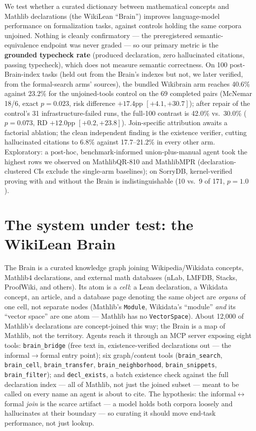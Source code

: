 \documentclass[10pt]{article}
\newcommand{\code}[1]{\texttt{#1}}
\begin{document}
We test whether a curated dictionary between mathematical concepts and
Mathlib declarations (the WikiLean ``Brain'') improves language-model
performance on formalization tasks, against controls holding the same
corpora unjoined. Nothing is cleanly confirmatory --- the preregistered
semantic-equivalence endpoint was never graded --- so our primary metric
is the \textbf{grounded typecheck rate} (produced declaration, zero
hallucinated citations, passing typecheck), which does not measure
semantic correctness. On 100 post-Brain-index tasks (held out from the
Brain's indexes but not, we later verified, from the formal-search arms'
sources), the bundled Wikibrain arm reaches 40.6\% against 23.2\% for the
unjoined-tools control on the 69 completed pairs (McNemar 18/6, exact
$p=0.023$, risk difference $+17.4$pp $[+4.1, +30.7]$); after repair of the
control's 31 infrastructure-failed runs, the full-100 contrast is 42.0\%
vs.\ 30.0\% ($p=0.073$, RD $+12.0$pp $[+0.2, +23.8]$). Join-specific
attribution awaits a factorial ablation; the clean independent finding is
the existence verifier, cutting hallucinated citations to 6.8\% against
17.7--21.2\% in every other arm. Exploratory: a post-hoc,
benchmark-informed union-plus-manual agent took the highest rows we
observed on MathlibQR-810 and MathlibMPR (declaration-clustered CIs
exclude the single-arm baselines); on SorryDB, kernel-verified proving
with and without the Brain is indistinguishable (10 vs.\ 9 of 171,
$p=1.0$).

\section{The system under test: the WikiLean Brain}\label{sec:system}

The Brain is a curated knowledge graph joining Wikipedia/Wikidata
concepts, Mathlib4 declarations, and external math databases (nLab, LMFDB,
Stacks, ProofWiki, and others). Its atom is a \emph{cell}: a Lean
declaration, a Wikidata concept, an article, and a database page denoting
the same object are \emph{organs} of one cell, not separate nodes
(Mathlib's \code{Module}, Wikidata's ``module'' \emph{and} its ``vector
space'' are one atom --- Mathlib has no \code{VectorSpace}). About
12{,}000 of Mathlib's declarations are concept-joined this way; the Brain
is a map of Mathlib, not the territory. Agents reach it through an MCP
server exposing eight tools: \code{brain\_bridge} (free text in,
existence-verified declarations out --- the informal$\to$formal entry
point); six graph/content tools (\code{brain\_search}, \code{brain\_cell},
\code{brain\_transfer}, \code{brain\_neighborhood}, \code{brain\_snippets},
\code{brain\_filter}); and \code{decl\_exists}, a batch existence check
against the full declaration index --- all of Mathlib, not just the joined
subset --- meant to be called on every name an agent is about to cite. The
hypothesis: the informal$\leftrightarrow$formal \emph{join} is the scarce
artifact --- a model holds both corpora loosely and hallucinates at their
boundary --- so curating it should move end-task performance, not just
lookup.
\end{document}
